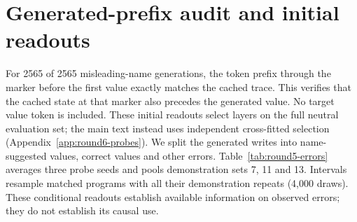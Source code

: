 \newsavebox{\roundfivebox}
\section{Generated-prefix audit and initial readouts}
\label{app:round5-errors}
For 2565 of 2565 misleading-name generations, the token prefix through the marker before the first value exactly matches the cached trace. This verifies that the cached state at that marker also precedes the generated value. No target value token is included.
These initial readouts select layers on the full neutral evaluation set; the main text instead uses independent cross-fitted selection (Appendix~\ref{app:round6-probes}). We split the generated writes into name-suggested values, correct values and other errors. Table~\ref{tab:round5-errors} averages three probe seeds and pools demonstration sets 7, 11 and 13. Intervals resample matched programs with all their demonstration repeats (4,000 draws). These conditional readouts establish available information on observed errors; they do not establish its causal use.
\begin{table}[t]
\centering\small
{}
\ifdim\wd\roundfivebox>\textwidth\resizebox{\textwidth}{!}{\usebox{\roundfivebox}}\else\usebox{\roundfivebox}\fi
\caption{Disjoint probes at the verified generated prefix. A dash denotes an empty stratum. The denominator is observed writes within each stratum, not independent demonstration repeats.}
\label{tab:round5-errors}
\end{table}
